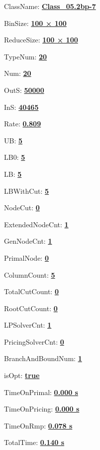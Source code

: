 \documentclass[11pt]{article}
\begin{document}
\pagestyle{empty}


ClassName: \underline{\textbf{Class_05.2bp-7}}
\par
BinSize: \underline{\textbf{100 × 100}}
\par
ReduceSize: \underline{\textbf{100 × 100}}
\par
TypeNum: \underline{\textbf{20}}
\par
Num: \underline{\textbf{20}}
\par
OutS: \underline{\textbf{50000}}
\par
InS: \underline{\textbf{40465}}
\par
Rate: \underline{\textbf{0.809}}
\par
UB: \underline{\textbf{5}}
\par
LB0: \underline{\textbf{5}}
\par
LB: \underline{\textbf{5}}
\par
LBWithCut: \underline{\textbf{5}}
\par
NodeCut: \underline{\textbf{0}}
\par
ExtendedNodeCnt: \underline{\textbf{1}}
\par
GenNodeCnt: \underline{\textbf{1}}
\par
PrimalNode: \underline{\textbf{0}}
\par
ColumnCount: \underline{\textbf{5}}
\par
TotalCutCount: \underline{\textbf{0}}
\par
RootCutCount: \underline{\textbf{0}}
\par
LPSolverCnt: \underline{\textbf{1}}
\par
PricingSolverCnt: \underline{\textbf{0}}
\par
BranchAndBoundNum: \underline{\textbf{1}}
\par
isOpt: \underline{\textbf{true}}
\par
TimeOnPrimal: \underline{\textbf{0.000 s}}
\par
TimeOnPricing: \underline{\textbf{0.000 s}}
\par
TimeOnRmp: \underline{\textbf{0.078 s}}
\par
TotalTime: \underline{\textbf{0.140 s}}
\par
\newpage


\end{document}
